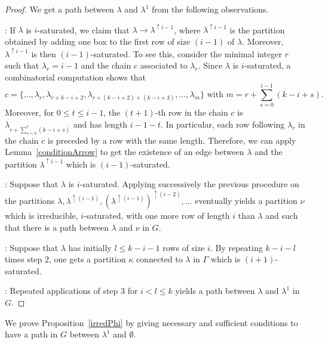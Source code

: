 \documentclass[ALCO,ThmDefs,Unicode,epreuves]{cedram}
\begin{document}
\begin{proof}
We get a path between $\lambda$ and $\lambda^{1}$ from the following observations.

: If $\lambda$ is $i$-saturated, we claim that $\lambda
\rightarrow\lambda^{\uparrow i-1}$, where $\lambda^{\uparrow i-1}$ is the
partition obtained by adding one box to the first row of size $(i-1)$ of
$\lambda$. Moreover, $\lambda^{\uparrow i-1}$ is then $(i-1)$-saturated. To
see this, consider the minimal integer $r$ such that $\lambda_{r}=i-1$ and the
chain $c$ associated to $\lambda_{r}$. Since $\lambda$ is $i$-saturated, a
combinatorial computation shows that
\[
c=\{\ldots,\lambda_{r},\lambda_{r+k-i+2},\lambda_{r+(k-i+2)+(k-i+3)}%
,\ldots,\lambda_{m}\}\text{ with }m=r+\sum_{s=0}^{i-1}(k-i+s).
\]
Moreover, for $0\leq t\leq i-1$, the $(t+1)$-th row in the chain $c$ is
$\lambda_{r+\sum_{s=0}^{t}(k-i+s)}$ and has length $i-1-t$. In particular,
each row following $\lambda_{r}$ in the chain $c$ is preceded by a row with
the same length. Therefore, we can apply Lemma~\ref{conditionArrow} to get the
existence of an edge between $\lambda$ and the partition $\lambda^{\uparrow
i-1}$ which is $(i-1)$-saturated.

: Suppose that $\lambda$ is $i$-saturated. Applying successively the
previous procedure on the partitions $\lambda,\lambda^{\uparrow(i-1)}%
,(\lambda^{\uparrow(i-1)})^{\uparrow(i-2)},\dots$ eventually yields a
partition $\nu$ which is irreducible, $i$-saturated, with one more row of
length $i$ than $\lambda$ and such that there is a path between $\lambda$ and
$\nu$ in $G$.

: Suppose that $\lambda$ has initially $l\leq k-i-1$ rows of size
$i$. By repeating $k-i-l$ times step 2, one gets a partition $\kappa$
connected to $\lambda$ in $\Gamma$ which is $(i+1)$-saturated.

: Repeated applications of step 3 for $i<l\leq k$ yields a path
between $\lambda$ and $\lambda^{1}$ in~$G$.
\end{proof}

We prove Proposition~\ref{irredPhi} by giving necessary and sufficient
conditions to have a path in $G$ between $\lambda^{1}$ and $\emptyset$.
\end{document}
